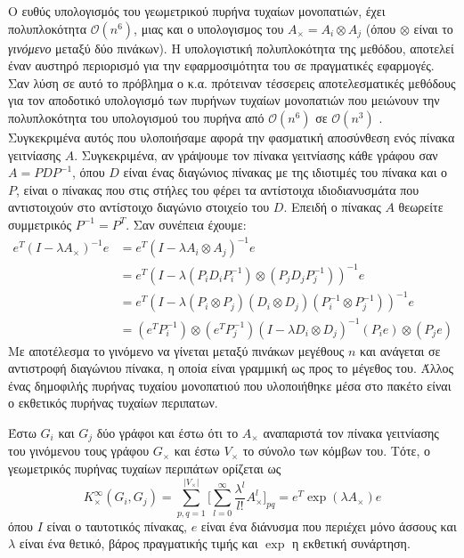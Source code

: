 Ο ευθύς υπολογισμός του γεωμετρικού πυρήνα τυχαίων μονοπατιών, έχει πολυπλοκότητα $\mathcal{O}(n^6)$, μιας και ο υπολογισμος του $A_{\times}=A_{i}\otimes A_{j}$ (όπου $\otimes$ είναι το \textit{γινόμενο } μεταξύ δύο πινάκων).
Η υπολογιστική πολυπλοκότητα της μεθόδου, αποτελεί έναν αυστηρό περιορισμό για την εφαρμοσιμότητα του σε πραγματικές εφαρμογές.
Σαν λύση σε αυτό το πρόβλημα ο  κ.α. πρότειναν τέσσερεις αποτελεσματικές μεθόδους για τον αποδοτικό υπολογισμό των πυρήνων τυχαίων μονοπατιών  που μειώνουν την πολυπλοκότητα του υπολογισμού του πυρήνα από $\mathcal{O}(n^6)$ σε $\mathcal{O}(n^3)$ \cite{vishwanathan2010graph}.
Συγκεκριμένα αυτός που υλοποιήσαμε αφορά την φασματική αποσύνθεση ενός πίνακα γειτνίασης $A$. Συγκεκριμένα, αν γράψουμε τον πίνακα γειτνίασης κάθε γράφου σαν $A=P D P^{-1}$, όπου $D$ είναι ένας διαγώνιος πίνακας με της ιδιοτιμές του πίνακα και ο $P$, είναι ο πίνακας που στις στήλες του φέρει τα αντίστοιχα ιδιοδιανυσμάτα που αντιστοιχούν στο αντίστοιχο διαγώνιο στοιχείο του $D$. Επειδή ο πίνακας $A$ θεωρείτε συμμετρικός $P^{-1}=P^{T}$. Σαν συνέπεια έχουμε:
\begin{equation}
\begin{aligned}
    e^T(I - \lambda A_{\times})^{-1} e & = e^T(I - \lambda A_{i}\otimes A_{j})^{-1} e \\ & = e^T(I - \lambda (P_{i} D_{i} P^{-1}_{i})\otimes (P_{j} D_{j} P^{-1}_{j}))^{-1} e \\
    & = e^T(I - \lambda (P_{i} \otimes P_{j}) (D_{i} \otimes D_{j}) (P^{-1}_{i} \otimes P^{-1}_{j}))^{-1} e \\
    &= (e^T P_{i}^{-1})\otimes (e^T P_{j}^{-1})(I - \lambda D_{i} \otimes D_{j})^{-1} (P_{i} e) \otimes (P_{j} e)
\end{aligned}
\end{equation}
Με αποτέλεσμα το γινόμενο  να γίνεται μεταξύ πινάκων μεγέθους $n$ και ανάγεται σε αντιστροφή διαγώνιου πίνακα, η οποία είναι γραμμική ως προς το μέγεθος του.
Άλλος ένας δημοφιλής πυρήνας τυχαίου μονοπατιού που υλοποιήθηκε μέσα στο πακέτο είναι ο εκθετικός πυρήνας τυχαίων περιπατων.
\begin{definition}
	Έστω $G_i$ και $G_j$ δύο γράφοι και έστω ότι το $A_\times$ αναπαριστά τον πίνακα γειτνίασης του γινόμενου τους γράφου $G_\times$ και έστω $V_\times$ το σύνολο των κόμβων του.
	Τότε, ο γεωμετρικός πυρήνας τυχαίων περιπάτων ορίζεται ως
	\begin{equation}
    	K_{\times}^{\infty}(G_i,G_j) = \sum_{p,q=1}^{|V_{\times}|} \Big[ \sum_{l=0}^{\infty} \frac{\lambda^l}{l!} A_{\times}^l \Big]_{pq} = e^T \exp(\lambda A_{\times}) e
    \end{equation}
	όπου $I$ είναι ο ταυτοτικός πίνακας, $e$ είναι ένα διάνυσμα που περιέχει μόνο άσσους και $\lambda$ είναι ένα θετικό, βάρος πραγματικής τιμής και $\exp$ η εκθετική συνάρτηση.
\end{definition}
